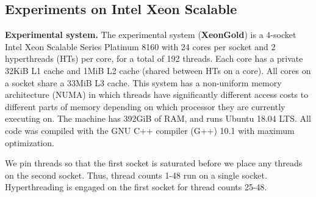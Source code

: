 \subsection{Experiments on Intel Xeon Scalable}

\vspace{1mm}\noindent\textbf{Experimental system.}
The experimental system (\textbf{XeonGold}) is a 4-socket Intel Xeon Scalable Series Platinum 8160 with 24 cores per socket and 2 hyperthreads (HTs) per core, for a total of 192 threads.
Each core has a private 32KiB L1 cache and 1MiB L2 cache (shared between HTs on a core).
All cores on a socket share a 33MiB L3 cache.
This system has a non-uniform memory architecture (NUMA) in which threads have significantly different access costs to different parts of memory depending on which processor they are currently executing on.
The machine has 392GiB of RAM, and runs Ubuntu 18.04 LTS.
All code was compiled with the GNU C++ compiler (G++) 10.1 with maximum optimization.

We pin threads so that the first socket is saturated before we place any threads on the second socket.
Thus, thread counts 1-48 run on a single socket.
Hyperthreading is engaged on the first socket for thread counts 25-48.




%
%


